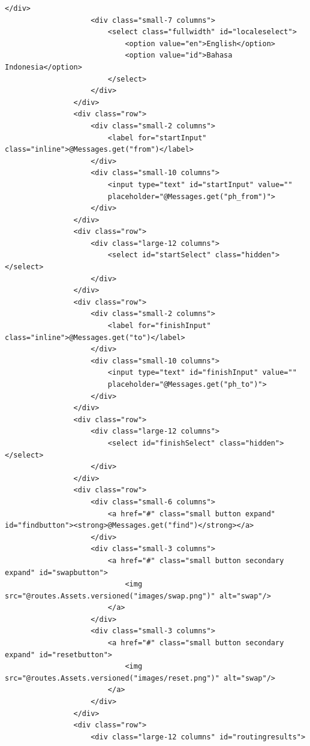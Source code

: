 \documentclass[a4paper,twoside]{article}
\begin{document}
\begin{enumerate}
\begin{lstlisting}[caption=Template \textit{view} pada Play Framework,label = {lst_2_kode_play}]
                    </div>
                    <div class="small-7 columns">
                        <select class="fullwidth" id="localeselect">
                            <option value="en">English</option>
                            <option value="id">Bahasa Indonesia</option>
                        </select>
                    </div>
                </div>
                <div class="row">
                    <div class="small-2 columns">
                        <label for="startInput" class="inline">@Messages.get("from")</label>
                    </div>
                    <div class="small-10 columns">
                        <input type="text" id="startInput" value=""
                        placeholder="@Messages.get("ph_from")">
                    </div>
                </div>
                <div class="row">
                    <div class="large-12 columns">
                        <select id="startSelect" class="hidden"></select>
                    </div>
                </div>
                <div class="row">
                    <div class="small-2 columns">
                        <label for="finishInput" class="inline">@Messages.get("to")</label>
                    </div>
                    <div class="small-10 columns">
                        <input type="text" id="finishInput" value=""
                        placeholder="@Messages.get("ph_to")">
                    </div>
                </div>
                <div class="row">
                    <div class="large-12 columns">
                        <select id="finishSelect" class="hidden"></select>
                    </div>
                </div>
                <div class="row">
                    <div class="small-6 columns">
                        <a href="#" class="small button expand" id="findbutton"><strong>@Messages.get("find")</strong></a>
                    </div>
                    <div class="small-3 columns">
                        <a href="#" class="small button secondary expand" id="swapbutton">
                            <img src="@routes.Assets.versioned("images/swap.png")" alt="swap"/>
                        </a>
                    </div>
                    <div class="small-3 columns">
                        <a href="#" class="small button secondary expand" id="resetbutton">
                            <img src="@routes.Assets.versioned("images/reset.png")" alt="swap"/>
                        </a>
                    </div>
                </div>
                <div class="row">
                    <div class="large-12 columns" id="routingresults">

\end{lstlisting}
\end{enumerate}
\end{document}

